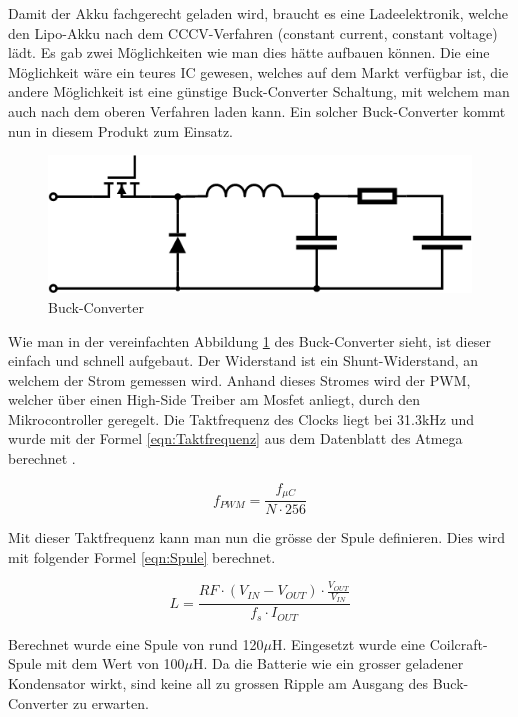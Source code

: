 Damit der Akku fachgerecht geladen wird, braucht es eine Ladeelektronik, welche den Lipo-Akku nach dem CCCV-Verfahren (constant current, constant voltage) lädt. Es gab zwei Möglichkeiten wie man dies hätte aufbauen können. Die eine Möglichkeit wäre ein teures IC gewesen, welches auf dem Markt verfügbar ist, die andere Möglichkeit ist eine günstige Buck-Converter Schaltung, mit welchem man auch nach dem oberen Verfahren laden kann. Ein solcher Buck-Converter kommt nun in diesem Produkt zum Einsatz.

\begin{figure} [H]
	\centering
	\includegraphics[width=0.6\linewidth]{images/Buck_Converter}
	\caption{Buck-Converter}
	\label{fig:Buck_Converter}
\end{figure}

Wie man in der vereinfachten Abbildung \ref{fig:Buck_Converter} des Buck-Converter sieht, ist dieser einfach und schnell aufgebaut. Der Widerstand ist ein Shunt-Widerstand, an welchem der Strom gemessen wird. Anhand dieses Stromes wird der PWM, welcher über einen High-Side Treiber am Mosfet anliegt, durch den Mikrocontroller geregelt. Die Taktfrequenz des Clocks liegt bei 31.3kHz und wurde mit der Formel \eqref{eqn:Taktfrequenz} aus dem Datenblatt des Atmega berechnet \cite{DatenblattATMEGA}.

\begin{equation}
f_{ PWM }=\frac { { f }_{ \mu C } }{ N\cdot256 } 
\label{eqn:Taktfrequenz}
\end{equation}

Mit dieser Taktfrequenz kann man nun die grösse der Spule definieren. Dies wird mit folgender Formel \eqref{eqn:Spule} berechnet.

\begin{equation}
L=\frac { RF\cdot\left( { V }_{ IN }-{ V }_{ OUT } \right) \cdot\frac { { V }_{ OUT } }{ { V }_{ IN } }  }{ { f }_{ s }\cdot{ I }_{ OUT } }  
\label{eqn:Spule}
\end{equation}

Berechnet wurde eine Spule von rund 120$\mu$H. Eingesetzt wurde eine Coilcraft-Spule mit dem Wert von 100$\mu$H. Da die Batterie wie ein grosser geladener Kondensator wirkt, sind keine all zu grossen Ripple am Ausgang des Buck-Converter zu erwarten.

